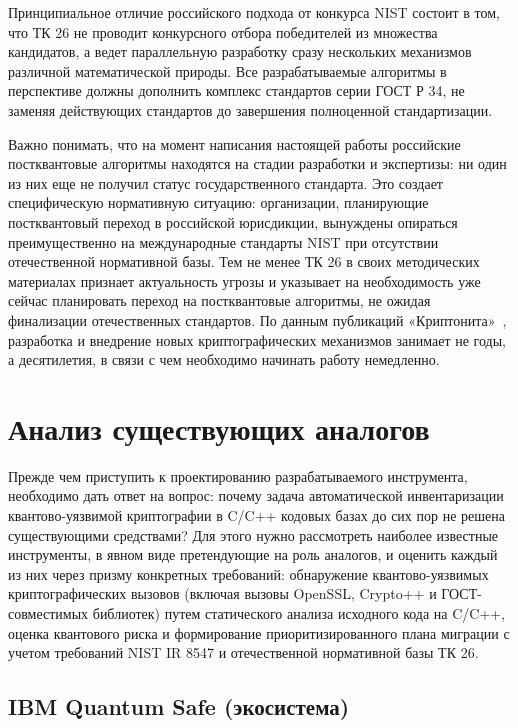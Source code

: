 \documentclass{itmo-vkr}
\begin{document}
	Принципиальное отличие российского подхода от конкурса NIST состоит в том, что ТК 26 не проводит конкурсного отбора победителей из множества кандидатов, а ведет параллельную разработку сразу нескольких механизмов различной математической природы. Все разрабатываемые алгоритмы в перспективе должны дополнить комплекс стандартов серии ГОСТ Р 34, не заменяя действующих стандартов до завершения полноценной стандартизации.
	
	Важно понимать, что на момент написания настоящей работы российские постквантовые алгоритмы находятся на стадии разработки и экспертизы: ни один из них еще не получил статус государственного стандарта. Это создает специфическую нормативную ситуацию: организации, планирующие постквантовый переход в российской юрисдикции, вынуждены опираться преимущественно на международные стандарты NIST при отсутствии отечественной нормативной базы. Тем не менее ТК 26 в своих методических материалах признает актуальность угрозы и указывает на необходимость уже сейчас планировать переход на постквантовые алгоритмы, не ожидая финализации отечественных стандартов. По данным публикаций «Криптонита»~\cite{kryptonite-shipovnik}, разработка и внедрение новых криптографических механизмов занимает не годы, а десятилетия, в связи с чем необходимо начинать работу немедленно.
	
	\section{Анализ существующих аналогов}
	
	Прежде чем приступить к проектированию разрабатываемого инструмента, необходимо дать ответ на вопрос: почему задача автоматической инвентаризации квантово-уязвимой криптографии в C/C++ кодовых базах до сих пор не решена существующими средствами? Для этого нужно рассмотреть наиболее известные инструменты, в явном виде претендующие на роль аналогов, и оценить каждый из них через призму конкретных требований:  обнаружение квантово-уязвимых криптографических вызовов (включая вызовы OpenSSL, Crypto++ и ГОСТ-совместимых библиотек) путем статического анализа исходного кода на C/C++, оценка квантового риска и формирование приоритизированного плана миграции с учетом требований NIST IR 8547 и отечественной нормативной базы ТК 26.
	
	\subsection{IBM Quantum Safe (экосистема)}
	
\end{document}
